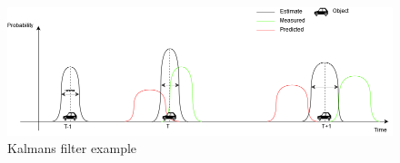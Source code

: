 \begin{figure}[H]
	\centering
	\includegraphics[width=0.7\linewidth]{positioning/positioning/DiagramKalman}
	\caption{Kalmans filter example}
	\label{fig:Kalmanfilter}
\end{figure}

